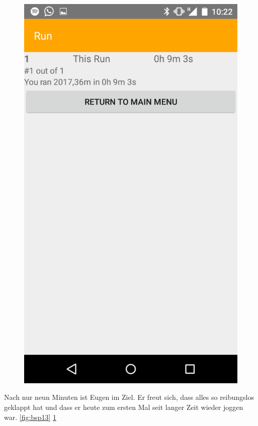 \begin{figure}[!h]
\begin{minipage}{.4\textwidth}
  \includegraphics[width=.8\linewidth]{abb/bsp/bsp14}
  \label{fig:bsp14}
\end{minipage}
\end{figure}

Nach nur neun Minuten ist Eugen im Ziel. Er freut sich, dass alles so reibungslos geklappt hat und dass er heute zum ersten Mal seit langer Zeit wieder joggen war. \ref{fig:bsp13} \ref{fig:bsp14}

